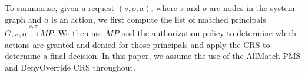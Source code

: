 \documentclass{article}
\newtheorem{definition}{Definition}
\renewcommand{\mp}{\mathit{MP}}
\begin{document}
To summarise, given a request $(s,o,a)$, where $s$ and $o$ are nodes in the system graph and $a$ is an action, we first compute the list of matched principals $G,s,o \xrightarrow{\rho,\sigma} \mp$.
We then use $\mp$ and the authorization policy to determine which actions are granted and denied for those principals and apply the CRS to determine a final decision.
In this paper, we assume the use of the \textsf{AllMatch} PMS and \textsf{DenyOverride} CRS throughout.
\begin{comment} \section{Negative Principal-Matching Conditions}\label{sec:negative-pmc}
In order to support more complex principal matching, and thereby be able to support useful constraints such as separation of duty and Chinese Wall (see Section~\ref{sec:audit}), we modify the RPPM model's principal-matching rule to support a \emph{negative principal-matching condition}.
Principals within these modified rules may only be matched when both the positive (original) principal-matching condition and negative principal-matching condition are taken into account.

\begin{definition}
     Let $P$ be a set of \emph{authorization principals} and let $R$ be a set of relationship labels.
     A \emph{principal-matching rule} has the form $(\ppmc, \npmc, p)$, where $p$ is an authorization principal and \ppmc and \npmc are either path conditions defined on $R$ or the special symbols $\top$ or $\bot$, respectively.
     The path condition \ppmc is called a \emph{positive principal-matching condition} whilst the path condition \npmc is called a \emph{negative principal-matching condition}.
     A \emph{principal-matching policy} $\rho$ is a list of principal-matching rules.
\end{definition}

Informally, principal-matching rules now support two principal-matching conditions, the second of which must \emph{not} be satisfied for the principal to apply.
Principal-matching rules of the form $(\ppmc, \bot, p)$ only require the positive principal-matching condition \ppmc to be satisfied for the principal to apply.
(For simplicity of notation and backwards compatibility we interpret rules of the form $(\ppmc, p)$ as a short-hand for $(\ppmc, \bot, p)$.)
Those of the form $(\top, \npmc, p)$ only require that the negative principal-matching condition \npmc not be satisfied for the principal to apply.
Rules of the form $(\ppmc, \npmc, p)$ require that both \ppmc is satisfied and \npmc not be satisfied for the principal to apply.
Finally a single optional default principal-matching rule may still be utilised, now taking the form $(\top, \bot, p)$.


\end{comment}
\end{document}
